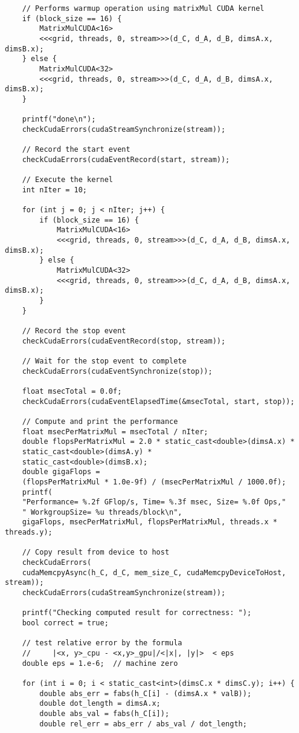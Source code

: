 \begin{lstlisting}
	// Performs warmup operation using matrixMul CUDA kernel
	if (block_size == 16) {
		MatrixMulCUDA<16>
		<<<grid, threads, 0, stream>>>(d_C, d_A, d_B, dimsA.x, dimsB.x);
	} else {
		MatrixMulCUDA<32>
		<<<grid, threads, 0, stream>>>(d_C, d_A, d_B, dimsA.x, dimsB.x);
	}
	
	printf("done\n");
	checkCudaErrors(cudaStreamSynchronize(stream));
	
	// Record the start event
	checkCudaErrors(cudaEventRecord(start, stream));
	
	// Execute the kernel
	int nIter = 10;
	
	for (int j = 0; j < nIter; j++) {
		if (block_size == 16) {
			MatrixMulCUDA<16>
			<<<grid, threads, 0, stream>>>(d_C, d_A, d_B, dimsA.x, dimsB.x);
		} else {
			MatrixMulCUDA<32>
			<<<grid, threads, 0, stream>>>(d_C, d_A, d_B, dimsA.x, dimsB.x);
		}
	}
	
	// Record the stop event
	checkCudaErrors(cudaEventRecord(stop, stream));
	
	// Wait for the stop event to complete
	checkCudaErrors(cudaEventSynchronize(stop));
	
	float msecTotal = 0.0f;
	checkCudaErrors(cudaEventElapsedTime(&msecTotal, start, stop));
	
	// Compute and print the performance
	float msecPerMatrixMul = msecTotal / nIter;
	double flopsPerMatrixMul = 2.0 * static_cast<double>(dimsA.x) *
	static_cast<double>(dimsA.y) *
	static_cast<double>(dimsB.x);
	double gigaFlops =
	(flopsPerMatrixMul * 1.0e-9f) / (msecPerMatrixMul / 1000.0f);
	printf(
	"Performance= %.2f GFlop/s, Time= %.3f msec, Size= %.0f Ops,"
	" WorkgroupSize= %u threads/block\n",
	gigaFlops, msecPerMatrixMul, flopsPerMatrixMul, threads.x * threads.y);
	
	// Copy result from device to host
	checkCudaErrors(
	cudaMemcpyAsync(h_C, d_C, mem_size_C, cudaMemcpyDeviceToHost, stream));
	checkCudaErrors(cudaStreamSynchronize(stream));
	
	printf("Checking computed result for correctness: ");
	bool correct = true;
	
	// test relative error by the formula
	//     |<x, y>_cpu - <x,y>_gpu|/<|x|, |y|>  < eps
	double eps = 1.e-6;  // machine zero
	
	for (int i = 0; i < static_cast<int>(dimsC.x * dimsC.y); i++) {
		double abs_err = fabs(h_C[i] - (dimsA.x * valB));
		double dot_length = dimsA.x;
		double abs_val = fabs(h_C[i]);
		double rel_err = abs_err / abs_val / dot_length;
		

\end{lstlisting}
